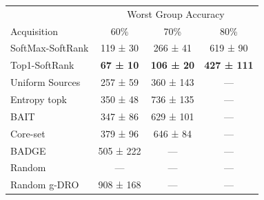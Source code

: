 \begin{tabular}{lccc}
\toprule
&\multicolumn{3}{c}{Worst Group Accuracy} \\
Acquisition & 60\% & 70\% & 80\% \\
\midrule
SoftMax-SoftRank & 119 ± 30 & 266 ± 41 & 619 ± 90 \\
Top1-SoftRank & \textbf{67 ± 10} & \textbf{106 ± 20} & \textbf{427 ± 111} \\
 Uniform Sources & 257 ± 59 & 360 ± 143 & — \\
Entropy topk & 350 ± 48 & 736 ± 135 & — \\
BAIT & 347 ± 86 & 629 ± 101 & — \\
Core-set & 379 ± 96 & 646 ± 84 & — \\
BADGE & 505 ± 222 & — & — \\
Random & — & — & — \\
Random g-DRO & 908 ± 168 & — & — \\
\bottomrule
\end{tabular}